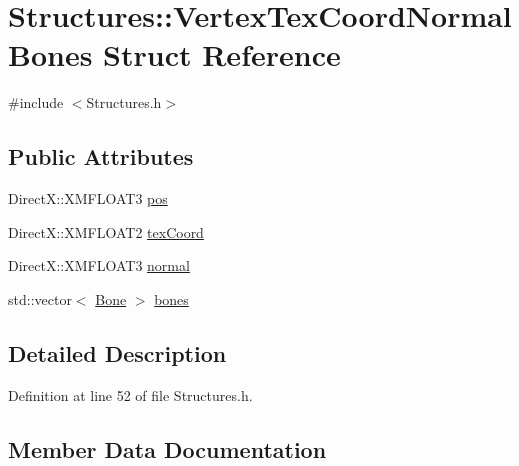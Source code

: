 \hypertarget{struct_structures_1_1_vertex_tex_coord_normal_bones}{}\section{Structures\+:\+:Vertex\+Tex\+Coord\+Normal\+Bones Struct Reference}
\label{struct_structures_1_1_vertex_tex_coord_normal_bones}


{\ttfamily \#include $<$Structures.\+h$>$}

\subsection*{Public Attributes}
\begin{DoxyCompactItemize}
\item 
Direct\+X\+::\+X\+M\+F\+L\+O\+A\+T3 \mbox{\hyperlink{struct_structures_1_1_vertex_tex_coord_normal_bones_a1d797de6d2ae0aa51c08bdec672d30f5}{pos}}
\item 
Direct\+X\+::\+X\+M\+F\+L\+O\+A\+T2 \mbox{\hyperlink{struct_structures_1_1_vertex_tex_coord_normal_bones_abaf5ae6c053da21097793b43e6fe4d7b}{tex\+Coord}}
\item 
Direct\+X\+::\+X\+M\+F\+L\+O\+A\+T3 \mbox{\hyperlink{struct_structures_1_1_vertex_tex_coord_normal_bones_af6cc8525c6e4d5c47bee42857ec81aeb}{normal}}
\item 
std\+::vector$<$ \mbox{\hyperlink{struct_structures_1_1_bone}{Bone}} $>$ \mbox{\hyperlink{struct_structures_1_1_vertex_tex_coord_normal_bones_abcfa247f03b099d663d5206328735845}{bones}}
\end{DoxyCompactItemize}


\subsection{Detailed Description}


Definition at line 52 of file Structures.\+h.



\subsection{Member Data Documentation}
\mbox{\label{struct_structures_1_1_vertex_tex_coord_normal_bones_abcfa247f03b099d663d5206328735845}} 
